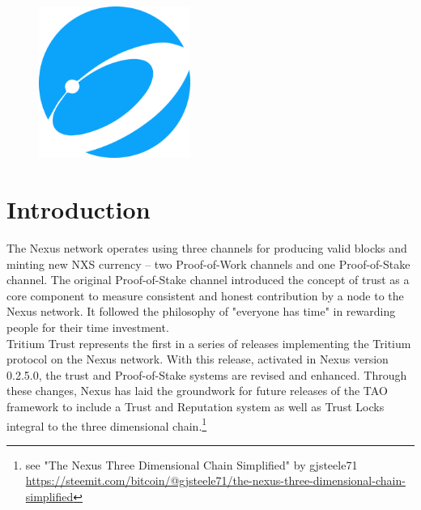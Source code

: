 \documentclass[11pt]{article}
\title{\rmfamily\normalfont{Nexus Proof-of-Stake with Tritium Trust}}
\author{Colin Cantrell\\
\and Scott Simon}
\date{October 12, 2018}
\begin{document}

\begin{figure}
    \centering
	\includegraphics[width=0.44\textwidth]{images/logo.png}
\end{figure}

\maketitle

\newpage
{}

\bigskip

\section{Introduction}
The Nexus network operates using three channels for producing valid blocks and minting new NXS currency -- two Proof-of-Work channels and one Proof-of-Stake channel. The original Proof-of-Stake channel introduced the concept of trust as a core component to measure consistent and honest contribution by a node to the Nexus network. It followed the philosophy of "everyone has time" in rewarding people for their time investment.\\

\noindent Tritium Trust represents the first in a series of releases implementing the Tritium protocol on the Nexus network. With this release, activated in Nexus version 0.2.5.0, the trust and Proof-of-Stake systems are revised and enhanced. Through these changes, Nexus has laid the groundwork for future releases of the TAO framework to include a Trust and Reputation system as well as Trust Locks integral to the three dimensional chain.\footnote{see "The Nexus Three Dimensional Chain Simplified" by gjsteele71\\ \url{https://steemit.com/bitcoin/@gjsteele71/the-nexus-three-dimensional-chain-simplified}} \\ 
\end{document}
